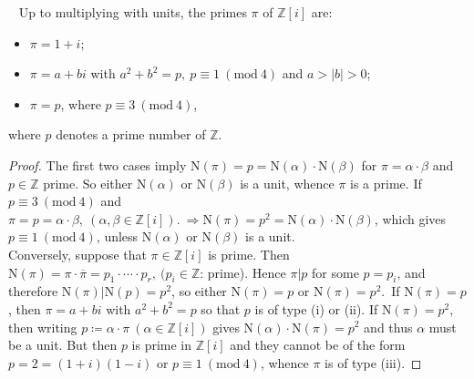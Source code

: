 \documentclass[12pt,a4paper,footinclude=true,headinclude=true]{scrbook} %
\newenvironment{proposition}[2][]
{\renewcommand\theinnercustomprop{#2}\innercustomprop[#1] 
\begin{mdframed}[backgroundcolor=gray!20]\ }
{\end{mdframed}\endinnercustomprop}
\begin{document}
\begin{proposition}{89}
    Up to multiplying with units, the primes $\pi$ of $\mathbb{Z}[i]$ are:
    \begin{itemize}
        \item[(i)] $\pi=1+i$;
        \item[(ii)] $\pi=a+bi$ with $a^2+b^2=p,\ p\equiv1\ (\mathrm{mod}\ 4)$ and $a>|b|>0$;
        \item[(iii)] $\pi=p$, where $p\equiv3\ (\mathrm{mod}\ 4)$,
    \end{itemize}
    where $p$ denotes a prime number of $\mathbb{Z}$.
\end{proposition}
\begin{proof}
    The first two cases imply $\mathrm{N}(\pi)=p=\mathrm{N}(\alpha)\cdot \mathrm{N}(\beta)$ for $\pi=\alpha\cdot\beta$ and $p\in\mathbb{Z}$ prime. So either $\mathrm{N}(\alpha)$ or $\mathrm{N}(\beta)$ is a unit, whence $\pi$ is a prime. If $p\equiv3\ (\mathrm{mod}\ 4)$ and $\pi=p=\alpha\cdot\beta,\ (\alpha, \beta\in\mathbb{Z}[i]).\ \Rightarrow \mathrm{N}(\pi)=p^2=\mathrm{N}(\alpha)\cdot \mathrm{N}(\beta)$, which gives $p\equiv1\ (\mathrm{mod}\ 4)$, unless $\mathrm{N}(\alpha)$ or $\mathrm{N}(\beta)$ is a unit. \\
    Conversely, suppose that $\pi\in\mathbb{Z}[i]$ is prime. Then $\mathrm{N}(\pi)=\pi\cdot\overline{\pi}= p_1\cdot\cdots\cdot p_r,\ (p_i\in \mathbb{Z}$: prime). Hence $\pi|p$ for some $p=p_i$, and therefore $\mathrm{N}(\pi)|\mathrm{N}(p)=p^2$, so either $\mathrm{N}(\pi)=p$ or $\mathrm{N}(\pi)=p^2$.\ If $\mathrm{N}(\pi)=p$, then $\pi=a+bi$ with $a^2+b^2=p$ so that $p$ is of type (i) or (ii). If $\mathrm{N}(\pi)=p^2$, then writing $p\coloneqq\alpha\cdot\pi\ (\alpha\in\mathbb{Z}[i])$ gives $\mathrm{N}(\alpha) \cdot\mathrm{N}(\pi)=p^2$ and thus $\alpha$ must be a unit. But then $p$ is prime in $\mathbb{Z}[i]$  and they cannot be of the form $p=2=(1+i)(1-i)$ or $p\equiv1\ (\mathrm{mod}\ 4)$, whence $\pi$ is of type (iii). 
\end{proof}
\end{document}
